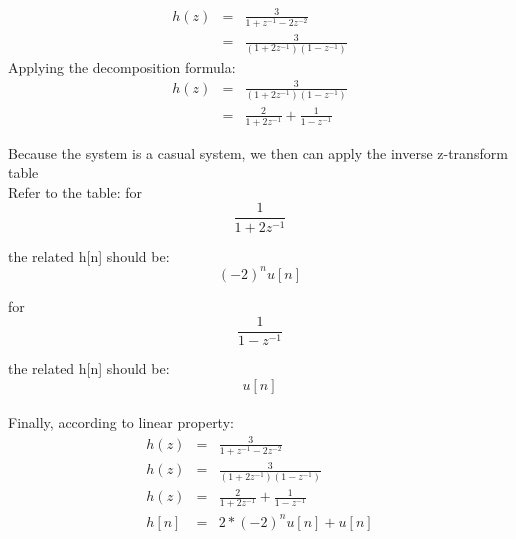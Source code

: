 \documentclass[11pt]{article}
\begin{document}
\begin{eqnarray*}
h(z)&=&\frac{3}{1+z^{-1}-2z^{-2}}\\
&=&\frac{3}{(1+2z^{-1})(1-z^{-1})}
\end{eqnarray*}
Applying the decomposition formula:
\begin{eqnarray*}
h(z)&=&\frac{3}{(1+2z^{-1})(1-z^{-1})}\\
&=&\frac{2}{1+2z^{-1}}+\frac{1}{1-z^{-1}}
\end{eqnarray*}


Because the system is a casual system, we then can apply the inverse z-transform table \\

Refer to the table:
for
 $$\frac{1}{1+2z^{-1}}$$

 the related h[n] should be:
 $$(-2)^nu[n]$$
 
for $$\frac{1}{1-z^{-1}}$$

the related h[n] should be:
$$u[n]$$\\

Finally, according to linear property:
\begin{eqnarray*}
h(z)&=&\frac{3}{1+z^{-1}-2z^{-2}}\\
h(z)&=&\frac{3}{(1+2z^{-1})(1-z^{-1})}\\
h(z)&=&\frac{2}{1+2z^{-1}}+\frac{1}{1-z^{-1}}\\
h[n]&=&2*(-2)^nu[n]+u[n]
\end{eqnarray*}
\end{document}
